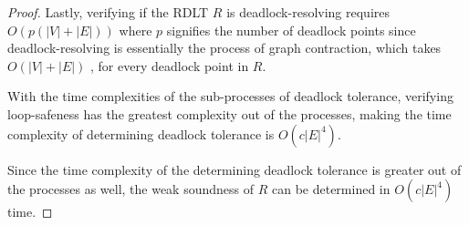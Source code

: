\begin{proof}
    Lastly, verifying if the RDLT $ R $ is deadlock-resolving requires $ O(p(|V| + |E|)) $ where $ p $ signifies the number of deadlock points since deadlock-resolving is essentially the process of graph contraction, which takes $ O(|V| + |E|) $ \cite{MalinaoPJS2023}, for every deadlock point in $ R $.
    
    With the time complexities of the sub-processes of deadlock tolerance, verifying loop-safeness has the greatest complexity out of the processes, making the time complexity of determining deadlock tolerance is $ O(c|E|^4) $.

    Since the time complexity of the determining deadlock tolerance is greater out of the processes as well, the weak soundness of $ R $ can be determined in $ O(c|E|^4) $ time.
\end{proof}

